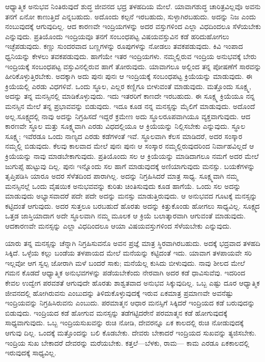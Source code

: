 ಆಧ್ಯಾತ್ಮಿಕ ಅನುಭವ ನಿಂತಿರುವುದೆ ಶುದ್ಧ ಜೀವನದ ಭದ್ರ ತಳಹದಿಯ ಮೇಲೆ. ಯಾವಾಗ\break ಶುದ್ಧ ಚಾರಿತ್ರವಿಲ್ಲವೊ ಅವನು ತನಗೆ ಏನೋ ಕಾಣುತ್ತಿದೆ ಎನ್ನಬಹುದು. ಅದೊಂದು ಕಲ್ಪನೆ ಇರಬಹುದು, ಸುಳ್ಳಾಗಿರಬಹುದು. ಅದನ್ನು ನಿಜ ಎಂದು ನಂಬುವುದಕ್ಕೆ ಆಗುವುದಿಲ್ಲ. ಆದ ಕಾರಣವೇ ಇಂದ್ರಿಯಗಳನ್ನು ಅದರ ವಸ್ತುಗಳಿಂದ ಎಲ್ಲಾ ವಿಧದಿಂದಲೂ ಸೆಳೆಯಬೇಕು ಎನ್ನುವುದು. ಪ್ರತಿಯೊಂದು ಇಂದ್ರಿಯವೂ ತನಗೆ ಸಂಬಂಧಪಟ್ಟ ವಿಷಯವಸ್ತುವಿನ ಕಡೆ ಹರಿದು\-ಹೋಗಲು ಇಚ್ಛೆಪಡುವುದು. ಕಣ್ಣು ಸುಂದರವಾದ ಬಣ್ಣಗಳನ್ನು ರೂಪುಗಳನ್ನು ನೋಡಲು ತವಕಪಡುವುದು. ಕಿವಿ ಇಂಪಾದ ಧ್ವನಿಯನ್ನು ಕೇಳಲು ತವಕಪಡುವುದು. ಹಾಗೆಯೇ ಇತರ ಇಂದ್ರಿಯಗಳು. ನಮ್ಮಲ್ಲಿರುವ ಇಂದ್ರಿಯ ಅನುಭವಕ್ಕೆ ಬೇರು ಇಂದ್ರಿಯಕ್ಕೆ ಸಂಬಂಧಪಟ್ಟ ವಸ್ತುವಿನಲ್ಲಿರುವ ಹಾಗೆ ತೋರುವುದು. ಯಾವಾಗಲೂ ಅಲ್ಲಿಂದ ತನ್ನ ಪೋಷಣೆಗೆ ಸಾರವನ್ನು ಹೀರಿಕೊಳ್ಳುತ್ತಿರಬೇಕು. ಅದಕ್ಕಾಗಿ ಅದು ಪುನಃ ಪುನಃ ಆ ಇಂದ್ರಿಯಕ್ಕೆ ಸಂಬಂಧಪಟ್ಟ ಕ್ರಿಯೆಯನ್ನು ಮಾಡುವುದು. ಈ ಕ್ರಿಯೆಯಲ್ಲಿ ಎರಡು ವಿಧಗಳಿವೆ. ಒಂದು ಸ್ಥೂಲ, ಎಲ್ಲರ ಕಣ್ಣಿಗೂ ಬೀಳುವಂತೆ ಮಾಡುವುದು. ಮತ್ತೊಂದು ಸೂಕ್ಷ್ಮ, ಅದನ್ನು ತನ್ನ ಮನಸ್ಸಿನಲ್ಲಿ ಮಾಡಿಕೊಳ್ಳುವುದು. ಇದು ಇತರರಿಗೆ ಕಾಣದೇ ಇರಬಹುದು. ಈ ಸೂಕ್ಷ್ಮ ಕ್ರಿಯೆಯೂ ನನ್ನ ಮನಸ್ಸಿನ ಮೇಲೆ ತನ್ನ ಪ್ರಭಾವವನ್ನು ಬಿಡುವುದು. ಇದೂ ಕೂಡ ನನ್ನ ಮನಸ್ಸನ್ನು ಮೈಲಿಗೆ ಮಾಡುವುದು. ಅದೊಂದೆ ಅಲ್ಲ.\break ಸೂಕ್ಷ್ಮದಲ್ಲಿ ನಾವು ಅದನ್ನು ನಿಗ್ರಹಿಸದೆ ಇದ್ದರೆ ಕ್ರಮೇಣ ಅದು ಸ್ಥೂಲರೂಪವಾಗಿಯೂ ವ್ಯಕ್ತವಾಗುವುದು. ಆದ ಕಾರಣವೇ ಸ್ಥೂಲ ಮತ್ತು ಸೂಕ್ಷ್ಮವಾಗಿ ಎರಡು ವಿಧದಲ್ಲಿಯೂ ಆ ಕ್ರಿಯೆಯನ್ನು ನಿಲ್ಲಿಸಬೇಕು ಎನ್ನುವುದು. ಸ್ಥೂಲ ಸೂಕ್ಷ್ಮ; ಇವೆರಡೂ ಒಂದು ನಾಣ್ಯದ ಎರಡು ಕಡೆಗಳಂತೆ ಇವೆ. ಸ್ಥೂಲವಾಗಿ ಕೆಲಸ ಮಾಡಿದರೆ, ಅದರ ಸಂಸ್ಕಾರ ನಮ್ಮಲ್ಲಿ ಬಿಡುವುದು. ಕೆಲವು ಕಾಲವಾದ ಮೇಲೆ ಪುನಃ ಪುನಃ ಆ ಸಂಸ್ಕಾರ ನಮ್ಮಲ್ಲಿರುವುದರಿಂದ ನಿರ್ವಾಹವಿಲ್ಲದೆ ಆ ಕ್ರಿಯೆಯನ್ನು ನಾವು ಮಾಡಬೇಕಾಗುವುದು. ಪ್ರತಿಯೊಂದು ಸಲ ಆ ಕ್ರಿಯೆಯನ್ನು ಮಾಡಿದಾಗಲೂ ನಮಗೆ ಅದರ ಮೇಲೆ ಜುಗುಪ್ಸೆ ಹುಟ್ಟುವು ದಿಲ್ಲ. ಪುನಃ ಇನ್ನೊಂದು ಸಲ ಹಾಗೆ ಮಾಡುವುದಕ್ಕೆ ಅಣಿಯಾಗುವುದು ಮನಸ್ಸು. ಬಯಕೆಗಳನ್ನು ತೃಪ್ತಿಪಡಿಸಿ ಯಾರೂ ಅದರ ಸೆಳೆತದಿಂದ ಪಾರಾಗಿಲ್ಲ. ಅದನ್ನು ನಿಗ್ರಹಿಸಿದರೆ ಮಾತ್ರ ಸಾಧ್ಯ. ಸೂಕ್ಷ್ಮವಾಗಿ ನಮ್ಮ ಮನಸ್ಸಿನಲ್ಲೆ ಒಂದು ವೈಷಯಿಕ ಅನುಭವವನ್ನು ಕುರಿತು ಚಿಂತಿಸುವುದು ಕೂಡ ಹಾಗೆಯೆ. ಒಂದು ಸಲ ಅದನ್ನು ಮಾಡುವುದು ಅಭ್ಯಾಸವಾದರೆ ಪದೇ ಪದೇ ಅದನ್ನು ಮನಸ್ಸು ಮಾಡುತ್ತಿರುವುದು. ಆ ಅನುಭವದ ಗೂಟಕ್ಕೆ ಮನಸ್ಸನ್ನು ಕಟ್ಟಿದಂತೆ ಆಗುವುದು. ಅದರ ಸುತ್ತಲೂ ಬರಬಹುದೆ ಹೊರತು ಅದನ್ನು ಕಿತ್ತುಕೊಂಡು ಹೋಗಲು ಸಾಧ್ಯವಿಲ್ಲ. ಸೂಕ್ಷ್ಮದ ಒತ್ತಡ ಜಾಸ್ತಿಯಾದಾಗ ಅದೇ ಸ್ಥೂಲವಾಗಿ ನಮ್ಮ ಮೂಲಕ ಆ ಕ್ರಿಯೆ ಬಲಾತ್ಕಾರವಾಗಿ ಆಗುವಂತೆ ಮಾಡುವುದು. ಆದಕಾರಣವೇ ಮನಸ್ಸನ್ನು ಎಲ್ಲಾ ವಿಧದಿಂದಲೂ ಆಯಾ ವಿಷಯವಸ್ತುಗಳಿಂದ ಸೆಳೆಯಬೇಕು ಎನ್ನುವುದು.

\newpage

ಯಾರು ತನ್ನ ಮನಸ್ಸನ್ನು ಚೆನ್ನಾಗಿ ನಿಗ್ರಹಿಸುವನೊ ಅವನ ಪ್ರಜ್ಞೆ ಮಾತ್ರ ಸ್ಥಿರವಾಗಿರಬಹುದು. ಅದಕ್ಕೆ ಭದ್ರವಾದ ತಳಹದಿ ಸಿಕ್ಕಿದೆ. ಒಳ್ಳೆಯ ಕಲ್ಲು ಬಂಡೆಯ ತಳಪಾಯದ ಮೇಲೆ ಮನೆಯನ್ನು ಕಟ್ಟಿದಂತೆ ಇದು. ಯಾವಾಗ ತಳಪಾಯವೇ ಸರಿ ಇಲ್ಲವೋ ಆಗ ಸ್ವಲ್ಪ ಜೋರಾಗಿ ಮಳೆ ಬಂದರೆ ಸಾಕು; ಮನೆಯೆಲ್ಲ ಕುಸಿದು ಬೀಳುವುದು. ನಾವು ಶೀಲದ ಮೇಲೆ ಗಮನ ಕೊಡದೆ ಆಧ್ಯಾತ್ಮಿಕ ಅನುಭವಗಳನ್ನು ಪಡೆಯಬೇಕೆಂದು ನೇರವಾಗಿ ಅದರ ಕಡೆ ಧಾವಿಸುವೆವು. ಇದರಿಂದ ಕೇವಲ ಉದ್ವೇಗ ಪರವಶತೆ ಆಗುವುದೇ ಹೊರತು ಶಾಶ್ವತವಾದ ಅನುಭವ ಸಿಕ್ಕುವುದಿಲ್ಲ. ಒಬ್ಬ ಎಷ್ಟು ದೂರ ಆಧ್ಯಾತ್ಮಿಕ ಜೀವನದಲ್ಲಿ ಹೋಗಿರುವನು ಎಂಬುದನ್ನು ತಿಳಿದುಕೊಳ್ಳುವುದಕ್ಕೆ ಇರುವ ಏಕಮಾತ್ರ ಪ್ರಮಾಣವೇ ಅವನೆಷ್ಟು ಇಂದ್ರಿಯವನ್ನು ನಿಗ್ರಹಿಸಿರುವನು ಎಂಬುದು. ಪರಮಾತ್ಮನ ಆಧಾರ ಮನಸ್ಸಿಗೆ ಸಿಕ್ಕಿದರೆ ಇಂದ್ರಿಯದ ಕಡೆ ಬರುವುದನ್ನು ಬಿಡುವುದು. ಇಂದ್ರಿಯದ ಕಡೆ ಹೋಗುವ ಮನಸ್ಸನ್ನು ತಡೆಗಟ್ಟಿದರೇನೆ ಪರಮಾತ್ಮನ ಕಡೆ ಹೋಗುವುದಕ್ಕೆ ಸಾಧ್ಯವಾಗುವುದು. ಒಬ್ಬ ಇಂದ್ರಿಯಸುಖವನ್ನು ರುಚಿ ನೋಡಿ, ದೇವರನ್ನೂ ಏಕ ಕಾಲದಲ್ಲಿ ರುಚಿ ನೋಡುವುದಕ್ಕೆ ಆಗುವು ದಿಲ್ಲ. ಒಂದಕ್ಕೆ ಮತ್ತೊಂದನ್ನು ಬಲಿ ಕೊಡಬೇಕು. ದೇವರು ಬೇಕಾದರೆ ಇಂದ್ರಿಯದ ಸುಖವನ್ನು ತ್ಯಜಿಸಬೇಕು. ಇಂದ್ರಿಯ ಸುಖ ಬೇಕಾದರೆ ದೇವರನ್ನು ಮರೆಯಬೇಕು. ಕತ್ತಲೆ—ಬೆಳಕು, ರಾಮ— ಕಾಮ ಎರಡೂ ಏಕಕಾಲದಲ್ಲಿ ಇರುವುದಕ್ಕೆ ಸಾಧ್ಯವಿಲ್ಲ.

